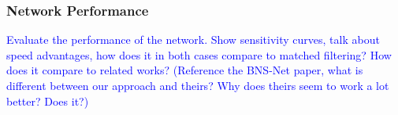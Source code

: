 \subsubsection{Network Performance}\label{sec:network_performance}
\textcolor{blue}{Evaluate the performance of the network. Show sensitivity curves, talk about speed advantages, how does it in both cases compare to matched filtering? How does it compare to related works? (Reference the BNS-Net paper, what is different between our approach and theirs? Why does theirs seem to work a lot better? Does it?)}
